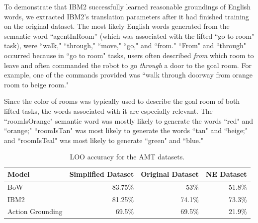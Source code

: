 \documentclass[conference]{IEEEtran}
\begin{document}

To demonstrate that IBM2 successfully learned reasonable groundings of English words, we extracted IBM2's translation parameters after it had finished training on the original dataset. The most likely English words generated from the semantic word ``agentInRoom'' (which was associated with the lifted ``go to room" task), were ``walk," ``through," ``move," ``go," and ``from."  ``From" and ``through" occurred because in ``go to room" tasks, users often described {\em from} which room to leave and often commanded the robot to go {\em through} a door to the goal room. For example, one of the commands provided was ``walk through doorway from orange room to beige room."


Since the color of rooms was typically used to describe the goal room of both lifted tasks, the words associated with it are especially relevant. The ``roomIsOrange" semantic word was mostly likely to generate the words ``red" and ``orange;" ``roomIsTan" was most likely to generate the words ``tan" and ``beige;" and ``roomIsTeal" was most likely to generate ``green" and ``blue."



\begin{table}[tb]
\begin{center}
\begin{tabular}{@{}lrrr@{}} \toprule
Model & Simplified Dataset & Original Dataset & NE Dataset \\ \midrule
 BoW & 83.75\% & 53\% & 51.8\%\\ 
 IBM2 & 81.25\% & 74.1\% & 73.3\% \\ 
 Action Grounding & 69.5\% & 69.5\% & 21.9\% \\\bottomrule
\hline
 \end{tabular} 
 \caption{LOO accuracy for the AMT datasets.}
 \label{tab:res}
\end{center}
\end{table}
\end{document}
